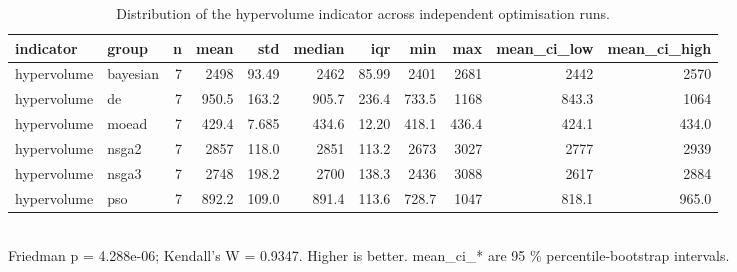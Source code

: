 \begin{table}[!t]
\centering
\caption{Distribution of the hypervolume indicator across independent optimisation runs.}
\label{tab:statistics_optimizer_hypervolume_main}
\footnotesize
\begin{tabular}{llrrrrrrrrr}
\toprule
indicator & group & n & mean & std & median & iqr & min & max & mean\_ci\_low & mean\_ci\_high \\
\midrule
hypervolume & bayesian & 7 & 2498 & 93.49 & 2462 & 85.99 & 2401 & 2681 & 2442 & 2570 \\
hypervolume & de & 7 & 950.5 & 163.2 & 905.7 & 236.4 & 733.5 & 1168 & 843.3 & 1064 \\
hypervolume & moead & 7 & 429.4 & 7.685 & 434.6 & 12.20 & 418.1 & 436.4 & 424.1 & 434.0 \\
hypervolume & nsga2 & 7 & 2857 & 118.0 & 2851 & 113.2 & 2673 & 3027 & 2777 & 2939 \\
hypervolume & nsga3 & 7 & 2748 & 198.2 & 2700 & 138.3 & 2436 & 3088 & 2617 & 2884 \\
hypervolume & pso & 7 & 892.2 & 109.0 & 891.4 & 113.6 & 728.7 & 1047 & 818.1 & 965.0 \\
\bottomrule
\end{tabular}
\\[2pt] \footnotesize Friedman p = 4.288e-06; Kendall's W = 0.9347. Higher is better. mean\_ci\_* are 95 \% percentile-bootstrap intervals.
\end{table}
